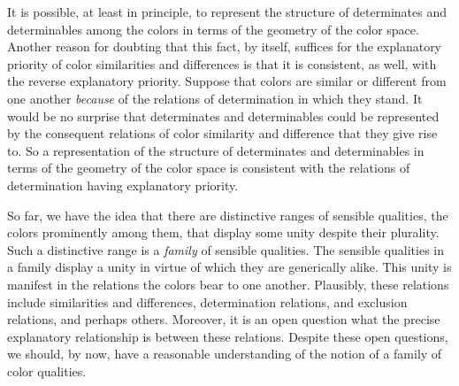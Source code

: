 \documentclass[12pt]{article}
\begin{document}
It is possible, at least in principle, to represent the structure of determinates and determinables among the colors in terms of the geometry of the color space. Another reason for doubting that this fact, by itself, suffices for the explanatory priority of color similarities and differences is that it is consistent, as well, with the reverse explanatory priority. Suppose that colors are similar or different from one another \emph{because} of the relations of determination in which they stand. It would be no surprise that determinates and determinables could be represented by the consequent relations of color similarity and difference that they give rise to. So a representation of the structure of determinates and determinables in terms of the geometry of the color space is consistent with the relations of determination having explanatory priority.

So far, we have the idea that there are distinctive ranges of sensible qualities, the colors prominently among them, that display some unity despite their plurality. Such a distinctive range is a \emph{family} of sensible qualities. The sensible qualities in a family display a unity in virtue of which they are generically alike. This unity is manifest in the relations the colors bear to one another. Plausibly, these relations include similarities and differences, determination relations, and exclusion relations, and perhaps others. Moreover, it is an open question what the precise explanatory relationship is between these relations. Despite these open questions, we should, by now, have a reasonable understanding of the notion of a family of color qualities.
\end{document}

